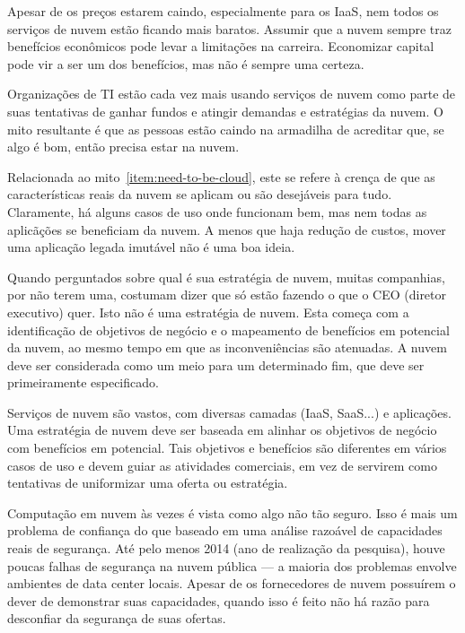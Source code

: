 \begin{enumerate}
        Apesar de os preços estarem caindo, especialmente para os IaaS, nem todos os 
        serviços de nuvem estão ficando mais baratos. Assumir que a nuvem sempre 
        traz benefícios econômicos pode levar a limitações na carreira. Economizar 
        capital pode vir a ser um dos benefícios, mas não é sempre uma certeza.

    \label{item:need-to-be-cloud}
        Organizações de TI estão cada vez mais usando serviços de nuvem como parte 
        de suas tentativas de ganhar fundos e atingir demandas e estratégias da 
        nuvem. O mito resultante é que as pessoas estão caindo na armadilha de 
        acreditar que, se algo é bom, então precisa estar na nuvem.

        Relacionada ao mito~\ref{item:need-to-be-cloud}, este se refere à crença de 
        que as características reais da nuvem se aplicam ou são desejáveis para 
        tudo. Claramente, há alguns casos de uso onde funcionam bem, mas nem todas 
        as aplicãções se beneficiam da nuvem. A menos que haja redução de custos, 
        mover uma aplicação legada imutável não é uma boa ideia.

        Quando perguntados sobre qual é sua estratégia de nuvem, muitas companhias, 
        por não terem uma, costumam dizer que só estão fazendo o que o CEO (diretor 
        executivo) quer. Isto não é uma estratégia de nuvem. Esta começa com a 
        identificação de objetivos de negócio e o mapeamento de benefícios em 
        potencial da nuvem, ao mesmo tempo em que as inconveniências são atenuadas. 
        A nuvem deve ser considerada como um meio para um determinado fim, que deve 
        ser primeiramente especificado.

        Serviços de nuvem são vastos, com diversas camadas (IaaS, SaaS...) e 
        aplicações. Uma estratégia de nuvem deve ser baseada em alinhar os objetivos 
        de negócio com benefícios em potencial. Tais objetivos e benefícios são 
        diferentes em vários casos de uso e devem guiar as atividades comerciais, em 
        vez de servirem como tentativas de uniformizar uma oferta ou estratégia.

        Computação em nuvem às vezes é vista como algo não tão seguro. Isso é mais 
        um problema de confiança do que baseado em uma análise razoável de 
        capacidades reais de segurança. Até pelo menos 2014 (ano de realização da 
        pesquisa), houve poucas falhas de segurança na nuvem pública --- a maioria 
        dos problemas envolve ambientes de data center locais. Apesar 
        de os fornecedores de nuvem possuírem o dever de demonstrar suas capacidades, 
        quando isso é feito não há razão para desconfiar da segurança de suas 
        ofertas.


\end{enumerate}
